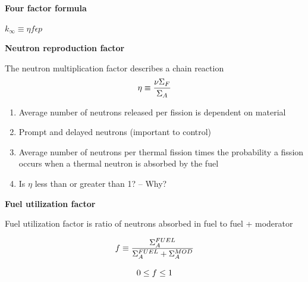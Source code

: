 \documentclass[aspectratio=1610,pdftex,dvipsnames,compress,xcolor={dvipsnames}]{beamer}
\begin{document}
\begin{frame}[plain]{}
    \centering\LARGE\textbf{Four factor formula}
\end{frame}


\begin{frame}[plain]{}
    \centering\LARGE $k_\infty \equiv \eta f \epsilon p$
\end{frame}


\begin{frame}[plain]{}
    \centering\LARGE\textbf{Neutron reproduction factor}
\end{frame}


\addtocounter{framenumber}{-3} 
\begin{frame}{The neutron multiplication factor describes a chain reaction}
    \begin{equation}
        \LARGE
        \eta \equiv \frac{\nu \Sigma_F}{\Sigma_A}
    \end{equation}

    \vspace*{\fill}

    \begin{enumerate}[series=outerlist,topsep=0pt,itemsep=21pt,leftmargin=*,label=(\arabic*)]
        \item[]Average number of neutrons released per fission is dependent on material
        \item[]Prompt and delayed neutrons (important to control)
        \item[]Average number of neutrons per thermal fission times the probability a fission occurs when a thermal neutron is absorbed by the fuel
        \item[]Is $\eta$ less than or greater than 1? -- Why?
    \end{enumerate}
\end{frame}


\begin{frame}[plain]{}
    \centering\LARGE\textbf{Fuel utilization factor}
\end{frame}


\addtocounter{framenumber}{-1} 
\begin{frame}{Fuel utilization factor is ratio of neutrons absorbed in fuel to fuel + moderator}

    \begin{equation}
        \LARGE
        f \equiv \frac{\Sigma^{FUEL}_A}{\Sigma^{FUEL}_A + \Sigma^{MOD}_A}
    \end{equation}

    \begin{equation}
        \LARGE
        0 \leq f \leq 1
    \end{equation}

\end{frame}
\end{document}
